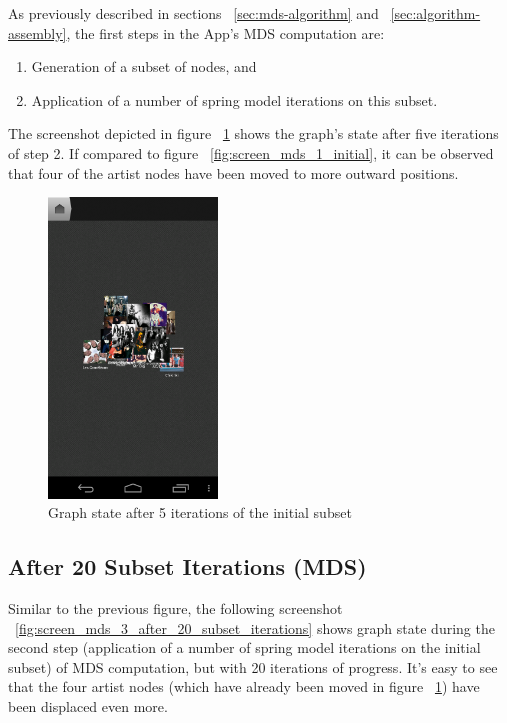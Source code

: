 As previously described in sections ~\ref{sec:mds-algorithm} and ~\ref{sec:algorithm-assembly}, the first steps in the App's MDS computation are:

\begin{enumerate}
	\item Generation of a subset of nodes, and
	\item Application of a number of spring model iterations on this subset.
\end{enumerate}

The screenshot depicted in figure ~\ref{fig:screen_mds_2_after_5_subset_iterations} shows the graph's state after five iterations of step 2. If compared to figure ~\ref{fig:screen_mds_1_initial}, it can be observed that four of the artist nodes have been moved to more outward positions.

\begin{figure}[H]
  \centering
    \includegraphics[width=0.4\textwidth]{figures/screen_mds_2_after_5_subset_iterations}
  \caption{Graph state after 5 iterations of the initial subset}
  \label{fig:screen_mds_2_after_5_subset_iterations}
\end{figure}

\newpage
\subsection{After 20 Subset Iterations (MDS)}

Similar to the previous figure, the following screenshot ~\ref{fig:screen_mds_3_after_20_subset_iterations} shows graph state during the second step (application of a number of spring model iterations on the initial subset) of MDS computation, but with 20 iterations of progress. It's easy to see that the four artist nodes (which have already been moved in figure ~\ref{fig:screen_mds_2_after_5_subset_iterations}) have been displaced even more.

